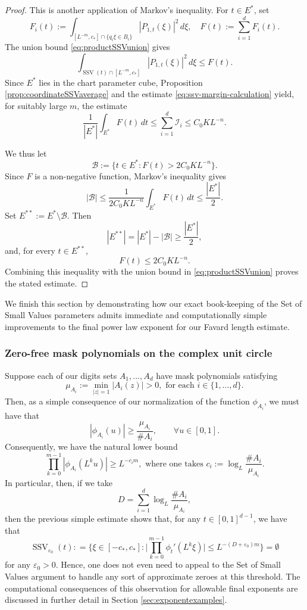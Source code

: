 \documentclass[12pt]{amsart}
\numberwithin{equation}{section}
\begin{document}
\begin{proof}
This is another application of Markov's inequality. For $t\in E^*$, set
\[
 F_i(t):=\int_{[L^{-m},c_*]\cap\{q_i\xi\in B_i\}}
 |P_{1,t}(\xi)|^2\,d\xi,
 \quad F(t):=\sum_{i=1}^dF_i(t).
\]
The union bound \eqref{eq:productSSVunion} gives
\[
 \int_{\operatorname{SSV}(t)\cap[L^{-m},c_*]}
 |P_{1,t}(\xi)|^2\,d\xi\leq F(t).
\]
Since $E^*$ lies in the chart parameter cube, Proposition
\ref{prop:coordinateSSVaverage} and the estimate
\eqref{eq:ssv-margin-calculation} yield, for suitably large $m$, the estimate
\[
 \frac1{|E^*|}\int_{E^*}F(t)\,dt
 \leq\sum_{i=1}^d\mathcal I_i
 \leq C_0KL^{-n}.
\]

We thus let 
\[
 \mathcal B:=\{t\in E^*:F(t)>2C_0KL^{-n}\}.
\]
Since $F$ is a non-negative function, Markov's inequality gives
\[
 |\mathcal B|
 \leq \frac{1}{2C_0KL^{-n}}\int_{E^*}F(t)\,dt
 \leq\frac{|E^*|}{2}.
\]
Set $E^{**}:=E^*\setminus\mathcal B$. Then
\[
 |E^{**}|=|E^*|-|\mathcal B|\geq\frac{|E^*|}{2},
\]
and, for every $t\in E^{**}$,
\[
 F(t)\leq2C_0KL^{-n}.
\]
Combining this inequality with the union bound in \eqref{eq:productSSVunion} proves the stated estimate.
\end{proof}

We finish this section by demonstrating how our exact book-keeping of the Set of Small Values parameters admits immediate and computationally simple improvements to the final power law exponent for our Favard length estimate.

\subsubsection{Zero-free mask polynomials on the complex unit circle}
Suppose each of our digits sets $A_1,...,A_d$ have mask polynomials satisfying
\[
 \mu_{A_i}:=\min_{|z|=1}|A_i(z)|>0, \textrm{ for each } i \in \{1,...,d\}.
\]
Then, as a simple consequence of our normalization of the function $\phi_{A_i}$, we must have that
\[
 |\phi_{A_i}(u)|\geq\frac{\mu_{A_i}}{\#A_i}, \qquad \forall u \in [0,1].
\]
Consequently, we have the natural lower bound
\[
 \prod_{k=0}^{m-1}|\phi_{A_i}(L^ku)|
 \geq L^{-c_im}, \textrm{ where one takes }
 c_i:=\log_L\frac{\#A_i}{\mu_{A_i}}.
\]
In particular, then, if we take
\begin{equation}\label{eq:zerofreeD}
 D=\sum_{i=1}^d\log_L\frac{\#A_i}{\mu_{A_i}},
\end{equation}
then the previous simple estimate shows that, for any $t \in [0,1]^{d-1}$, we have that
$$
\operatorname{SSV}_{\varepsilon_0}(t) : = \bigg\{\xi \in [-c_*,c_*] : \bigg\lvert \prod_{k=0}^{m-1} \phi_t' (L^k\xi)\bigg\rvert \leq L^{-(D+\varepsilon_0)m}  \bigg\} = \emptyset
$$
for any $\varepsilon_0 > 0$. Hence, one does not even need to appeal to the Set of Small Values argument to handle any sort of approximate zeroes at this threshold. The computational consequences of this observation for allowable final exponents are discussed in further detail in Section \ref{sec:exponentexamples}.
\end{document}
